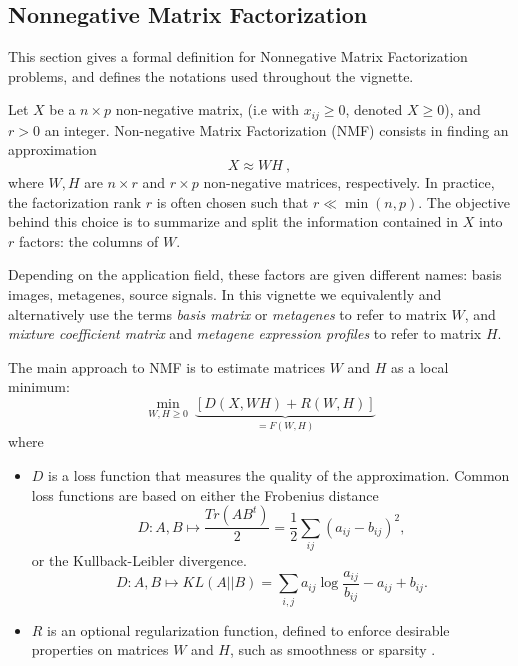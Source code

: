 \documentclass[a4paper]{article}
\begin{document}
\subsection{Nonnegative Matrix Factorization}

This section gives a formal definition for Nonnegative Matrix Factorization problems, 
and defines the notations used throughout the vignette. 

Let $X$ be a $n \times p$ non-negative matrix, (i.e with $x_{ij} \geq 0$,
denoted $X \geq 0$), and $r > 0$ an integer. Non-negative Matrix Factorization
(NMF) consists in finding an approximation 
\begin{equation}\label{NMFstd}
X \approx W H\ ,
\end{equation}
where $W, H$ are $n
\times r$ and $r \times p$ non-negative matrices, respectively. In practice,
the factorization rank $r$ is often chosen such that $r \ll \min(n, p)$. The
objective behind this choice is to summarize and split the information
contained in $X$ into $r$ factors: the columns of $W$. 

Depending on the application field, these factors are given different names: basis images,
metagenes, source signals. In this vignette we equivalently and alternatively use the terms 
\emph{basis matrix} or \emph{metagenes} to refer to matrix $W$, and 
\emph{mixture coefficient matrix} and \emph{metagene expression profiles} to 
refer to matrix $H$.

The main approach to NMF is to estimate matrices $W$ and $H$ as a local minimum:
\begin{equation}\label{nmf_min}
\min_{W, H \geq 0}\ \underbrace{[D(X, WH) + R(W, H)]}_{=F(W,H)} \label{eq:optim_base}
\end{equation}
where 

\begin{itemize}
\item $D$ is a loss function that measures the quality of the approximation. 
Common loss functions are based on either the Frobenius distance 
$$D: A,B\mapsto \frac{Tr(AB^t)}{2} = \frac{1}{2} \sum_{ij} (a_{ij} - b_{ij})^2,$$
or the Kullback-Leibler divergence.
$$D: A,B\mapsto KL(A||B) = \sum_{i,j} a_{ij} \log \frac{a_{ij}}{b_{ij}} - a_{ij} + b_{ij}.$$
\item $R$ is an optional regularization function, defined to enforce desirable
properties on matrices $W$ and $H$, such as smoothness or sparsity \cite{Cichocki04}.
\end{itemize}
\end{document}
